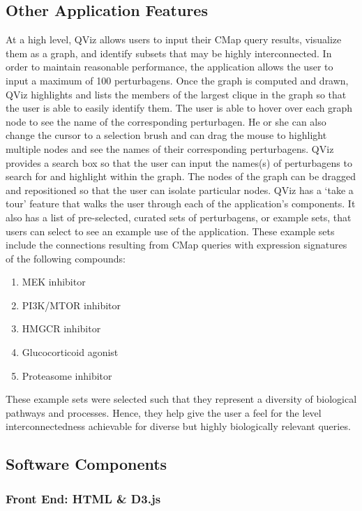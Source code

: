 \documentclass[12pt]{article}
\begin{document}
\subsection{Other Application Features}
At a high level, QViz allows users to input their CMap query results, visualize them as a graph, and identify subsets that may be highly interconnected. In order to maintain reasonable performance, the application allows the user to input a maximum of 100 perturbagens. Once the graph is computed and drawn, QViz highlights and lists the members of the largest clique in the graph so that the user is able to easily identify them. The user is able to hover over each graph node to see the name of the corresponding perturbagen. He or she can also change the cursor to a selection brush and can drag the mouse to highlight multiple nodes and see the names of their corresponding perturbagens. QViz provides a search box so that the user can input the names(s) of perturbagens to search for and highlight within the graph. The nodes of the graph can be dragged and repositioned so that the user can isolate particular nodes. 
QViz has a `take a tour' feature that walks the user through each of the application's components. It also has a list of pre-selected, curated sets of perturbagens, or example sets, that users can select to see an example use of the application. These example sets include the connections resulting from CMap queries with expression signatures of the following compounds:

\begin{enumerate}
\item MEK inhibitor
\item PI3K/MTOR inhibitor
\item HMGCR inhibitor
\item Glucocorticoid agonist
\item Proteasome inhibitor
\end{enumerate}

These example sets were selected such that they represent a diversity of biological pathways and processes. Hence, they help give the user a feel for the level interconnectedness achievable for diverse but highly biologically relevant queries.


\subsection{Software Components}
\subsubsection{Front End: HTML \& D3.js}
\end{document}
